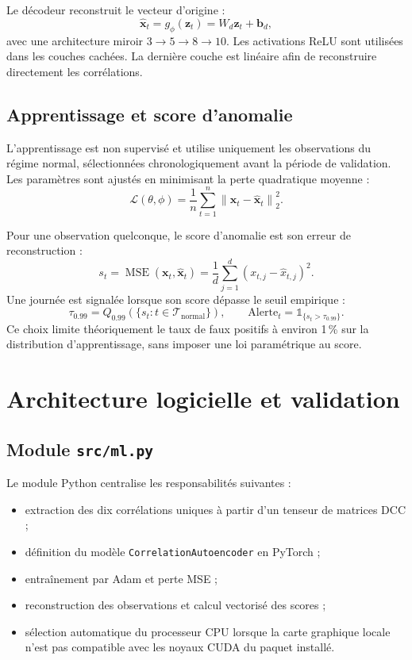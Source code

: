 \documentclass[12pt,a4paper]{article}
\begin{document}
Le décodeur reconstruit le vecteur d'origine :
\[
  \widehat{\mathbf{x}}_t=g_{\phi}(\mathbf{z}_t)
  =W_d\mathbf{z}_t+\mathbf{b}_d,
\]
avec une architecture miroir $3\rightarrow 5\rightarrow 8\rightarrow 10$. Les activations ReLU
sont utilisées dans les couches cachées. La dernière couche est linéaire afin de reconstruire
directement les corrélations.

\subsection{Apprentissage et score d'anomalie}

L'apprentissage est non supervisé et utilise uniquement les observations du régime normal,
sélectionnées chronologiquement avant la période de validation. Les paramètres sont ajustés en
minimisant la perte quadratique moyenne :
\[
  \mathcal{L}(\theta,\phi)
  =\frac{1}{n}\sum_{t=1}^{n}
  \left\|\mathbf{x}_t-\widehat{\mathbf{x}}_t\right\|_2^2.
\]

Pour une observation quelconque, le score d'anomalie est son erreur de reconstruction :
\[
  s_t=\operatorname{MSE}(\mathbf{x}_t,\widehat{\mathbf{x}}_t)
  =\frac{1}{d}\sum_{j=1}^{d}
  (x_{t,j}-\widehat{x}_{t,j})^2.
\]
Une journée est signalée lorsque son score dépasse le seuil empirique :
\[
  \tau_{0.99}=Q_{0.99}\left(\{s_t:t\in\mathcal{T}_{\mathrm{normal}}\}\right),
  \qquad
  \mathrm{Alerte}_t=\mathbb{1}_{\{s_t>\tau_{0.99}\}}.
\]
Ce choix limite théoriquement le taux de faux positifs à environ 1\,\% sur la distribution
d'apprentissage, sans imposer une loi paramétrique au score.

\section{Architecture logicielle et validation}

\subsection{Module \texttt{src/ml.py}}

Le module Python centralise les responsabilités suivantes :
\begin{itemize}
  \item extraction des dix corrélations uniques à partir d'un tenseur de matrices DCC ;
  \item définition du modèle \texttt{CorrelationAutoencoder} en PyTorch ;
  \item entraînement par Adam et perte MSE ;
  \item reconstruction des observations et calcul vectorisé des scores ;
  \item sélection automatique du processeur CPU lorsque la carte graphique locale n'est pas
        compatible avec les noyaux CUDA du paquet installé.
\end{itemize}
\end{document}
